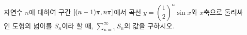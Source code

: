 자연수 $n$에 대하여 구간 $[(n-1)\pi{,}\mkern3mu\mathopen{}n\pi]$에서 곡선 $y=\left(\dfrac{1}{2}\right)^n\sin x$와 $x$축으로 둘러싸인 도형의 넓이를 $S_n$이라 할 때, $\displaystyle\sum_{n=1}^{\infty} S_n$의 값을 구하시오.
